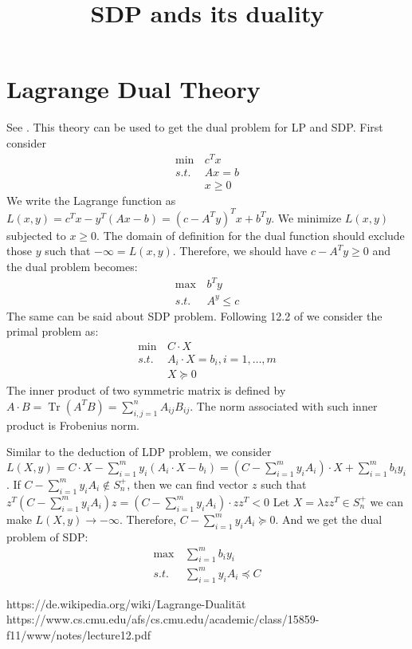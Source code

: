 \documentclass{article}
\title{SDP ands its duality}
\DeclareMathOperator{\tr}{Tr}
\begin{document}
\maketitle
\section{Lagrange Dual Theory}
See \cite{dual}. This theory can be used to get the dual problem for LP and SDP.
First consider
\begin{align*}
\min\, & c^T x \\
s.t. \,& Ax = b \\
&x \geq 0
\end{align*}
We write the Lagrange function as
$L(x,y) = c^T x - y^T(Ax-b) = (c - A^Ty)^Tx + b^T y$.
We minimize $L(x,y)$ subjected to $x \geq 0$. The domain of definition for the dual function should exclude
those $y$ such that $-\infty = L(x,y)$. Therefore, we should have $c-A^Ty \geq 0$ and
the dual problem becomes:
\begin{align*}
\max\, & b^T y \\
s.t. \,& A^y \leq c
\end{align*}
The same can be said about SDP problem. Following 12.2 of \cite{sdp} we consider the primal problem as:
\begin{align*}
\min\,& C \cdot X \\
s.t. \,& A_i \cdot X = b_i, i=1,\dots, m \\
& X \succeq 0
\end{align*}
The inner product of two symmetric matrix is defined by $A\cdot B = \tr(A^TB) = \sum_{i,j=1}^n A_{ij}B_{ij}$.
The norm associated with such inner product is Frobenius norm.

Similar to the deduction of LDP problem, we consider $L(X,y)= C\cdot X - \sum_{i=1}^m y_i (A_i \cdot X - b_i)
=(C-\sum_{i=1}^m y_i A_i)\cdot X + \sum_{i=1}^m b_i y_i$.
If $C-\sum_{i=1}^m y_i A_i \not\in S_n^+$, then we can find vector $z$ such that 
$z^T(C-\sum_{i=1}^m y_i A_i)z = (C-\sum_{i=1}^m y_i A_i) \cdot zz^T < 0$ Let $X=\lambda zz^T \in S_n^+$
we can make $L(X,y) \to -\infty$. Therefore, $C-\sum_{i=1}^m y_i A_i \succeq 0$.
And we get the dual problem of SDP:
\begin{align*}
\max\,&\sum_{i=1}^m b_i y_i \\
s.t.\,& \sum_{i=1}^m y_i A_i \preceq C
\end{align*}
\begin{thebibliography}{9}
	 https://de.wikipedia.org/wiki/Lagrange-Dualität
	 https://www.cs.cmu.edu/afs/cs.cmu.edu/academic/class/15859-f11/www/notes/lecture12.pdf
\end{thebibliography}
\end{document}
